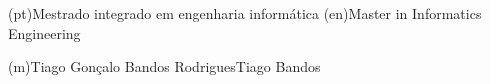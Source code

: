\ntdegreename*(pt){Mestrado integrado em engenharia informática}
\ntdegreename*(en){Master in Informatics Engineering}




\ntauthorname(m){Tiago Gonçalo Bandos Rodrigues}{Tiago Bandos}

